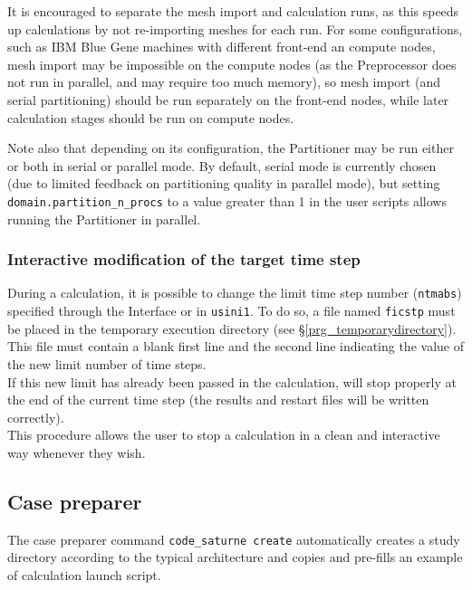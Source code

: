 {{{It is encouraged to separate the mesh import and calculation runs, as
this speeds up calculations by not re-importing meshes for each run.
For some configurations, such as IBM Blue Gene machines with different
front-end an compute nodes, mesh import may be impossible on the
compute nodes (as the Preprocessor does not run in parallel, and may require
too much memory), so mesh import (and serial partitioning) should be
run separately on the front-end nodes, while later calculation stages
should be run on compute nodes.

Note also that depending on its configuration, the Partitioner may
be run either or both in serial or parallel mode. By default, serial
mode is currently chosen (due to limited feedback on partitioning
quality in parallel mode), but setting \texttt{domain.partition\_n\_procs}
to a value greater than 1 in the user scripts allows running
the Partitioner in parallel.

\subsubsection{Interactive modification of the target time step}
\label{prg_ficstp}%
During a calculation, it is possible to change the limit time step number
(\texttt{ntmabs}) specified through the Interface or in \texttt{usini1}.
To do so, a file named \texttt{ficstp} must be placed in the temporary
execution directory (see \S\ref{prg_temporarydirectory}).
This file must contain a blank first line and
the second line indicating the value of the new limit number of time steps.\\
If this new limit has already been passed in the calculation, \CS will stop
properly at the end of the current time step (the results and restart files
will be written correctly).\\
This procedure allows the user to stop a calculation in a clean and interactive
way whenever they wish.


\subsection{Case preparer}
\label{prg_cscreate}%
The case preparer command \texttt{code\_saturne~create} automatically creates a
study directory according to the typical architecture and copies and
pre-fills an example of calculation launch script.

}}}
